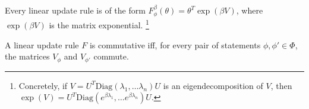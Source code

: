 \begin{prop}
Every linear update rule is of the form
$
    F^{\beta}_\phi(\theta) =  \theta^{T} \exp(\beta V)
$,
where $\exp(\beta V)$ is the matrix exponential.%
    \footnote{Concretely, if $V = U^T \mathrm{Diag}(\lambda_1, \ldots \lambda_n) U$ is an eigendecomposition of $V$, then $\exp(V) = U^T \mathrm{Diag}(e^{\beta\lambda_1}, \ldots e^{\beta\lambda_n}) U$.}
\end{prop}

\begin{prop}
A linear update rule $F$ is commutative iff, for every pair of statements  $\phi, \phi' \in \Phi$, the
matrices $V_\phi$ and $V_{\phi'}$ commute.
\end{prop}
